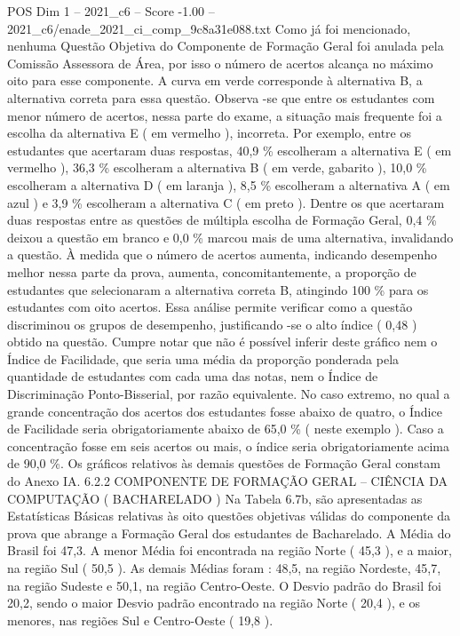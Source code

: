 \begin{textsample}{POS Dim 1 – 2021\_c6 – Score -1.00 – 2021\_c6/enade\_2021\_ci\_comp\_9c8a31e088.txt}
Como já foi mencionado, nenhuma Questão Objetiva do Componente de Formação Geral foi anulada pela Comissão Assessora de Área, por isso o número de acertos alcança no máximo oito para esse componente.
A curva em verde corresponde à alternativa B, a alternativa correta para essa questão.
Observa -se que entre os estudantes com menor número de acertos, nessa parte do exame, a situação mais frequente foi a escolha da alternativa E ( em vermelho ), incorreta.
Por exemplo, entre os estudantes que acertaram duas respostas, 40,9 \% escolheram a alternativa E ( em vermelho ), 36,3 \% escolheram a alternativa B ( em verde, gabarito ), 10,0 \% escolheram a alternativa D ( em laranja ), 8,5 \% escolheram a alternativa A ( em azul ) e 3,9 \% escolheram a alternativa C ( em preto ).
Dentre os que acertaram duas respostas entre as questões de múltipla escolha de Formação Geral, 0,4 \% deixou a questão em branco e 0,0 \% marcou mais de uma alternativa, invalidando a questão.
À medida que o número de acertos aumenta, indicando desempenho melhor nessa parte da prova, aumenta, concomitantemente, a proporção de estudantes que selecionaram a alternativa correta B, atingindo 100 \% para os estudantes com oito acertos.
Essa análise permite verificar como a questão discriminou os grupos de desempenho, justificando -se o alto índice ( 0,48 ) obtido na questão.
Cumpre notar que não é possível inferir deste gráfico nem o Índice de Facilidade, que seria uma média da proporção ponderada pela quantidade de estudantes com cada uma das notas, nem o Índice de Discriminação Ponto-Bisserial, por razão equivalente.
No caso extremo, no qual a grande concentração dos acertos dos estudantes fosse abaixo de quatro, o Índice de Facilidade seria obrigatoriamente abaixo de 65,0 \% ( neste exemplo ).
Caso a concentração fosse em seis acertos ou mais, o índice seria obrigatoriamente acima de 90,0 \%.
Os gráficos relativos às demais questões de Formação Geral constam do Anexo IA. 6.2.2 COMPONENTE DE FORMAÇÃO GERAL – CIÊNCIA DA COMPUTAÇÃO ( BACHARELADO ) Na Tabela 6.7b, são apresentadas as Estatísticas Básicas relativas às oito questões objetivas válidas do componente da prova que abrange a Formação Geral dos estudantes de Bacharelado.
A Média do Brasil foi 47,3.
A menor Média foi encontrada na região Norte ( 45,3 ), e a maior, na região Sul ( 50,5 ).
As demais Médias foram : 48,5, na região Nordeste, 45,7, na região Sudeste e 50,1, na região Centro-Oeste.
O Desvio padrão do Brasil foi 20,2, sendo o maior Desvio padrão encontrado na região Norte ( 20,4 ), e os menores, nas regiões Sul e Centro-Oeste ( 19,8 ).

\end{textsample}
